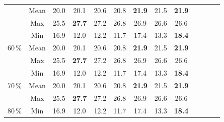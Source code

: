 \documentclass[fleqn,11pt]{ExcelAtFIT} %
\begin{document}
\begin{table}[t!]
\begin{tabular}{| c | c | c| c | c | c | c | c | c | c | c | c | c |}
         &Mean& 20.0 & 20.1  & 20.6
         & 20.8 & {\bf 21.9} & 21.5 & {\bf 21.9} \\ %

         &\textcolor{grayintable}{Max}& \textcolor{grayintable}{25.5} & \textcolor{grayintable}{{\bf 27.7}}  & \textcolor{grayintable}{27.2}
         & \textcolor{grayintable}{26.8} & \textcolor{grayintable}{26.9} & \textcolor{grayintable}{26.6}& \textcolor{grayintable}{26.6} \\ \hline\hline

         \multirow{3}{*}{60\,\%} &\textcolor{grayintable}{Min}& \textcolor{grayintable}{16.9} & \textcolor{grayintable}{12.0}  & \textcolor{grayintable}{12.2}
        & \textcolor{grayintable}{11.7} & \textcolor{grayintable}{17.4} & \textcolor{grayintable}{13.3}& \textcolor{grayintable}{{\bf 18.4}} \\ %

         &Mean& 20.0 & 20.1  & 20.6
         & 20.8 & {\bf 21.9} & 21.5 & {\bf 21.9} \\ %

         &\textcolor{grayintable}{Max}& \textcolor{grayintable}{25.5} & \textcolor{grayintable}{{\bf 27.7}}  & \textcolor{grayintable}{27.2}
         & \textcolor{grayintable}{26.8} & \textcolor{grayintable}{26.9} & \textcolor{grayintable}{26.6}& \textcolor{grayintable}{26.6} \\ \hline\hline

         \multirow{3}{*}{70\,\%} &\textcolor{grayintable}{Min}& \textcolor{grayintable}{16.9} & \textcolor{grayintable}{12.0}  & \textcolor{grayintable}{12.2}
        & \textcolor{grayintable}{11.7} & \textcolor{grayintable}{17.4} & \textcolor{grayintable}{13.3}& \textcolor{grayintable}{{\bf 18.4}} \\ %

         &Mean& 20.0 & 20.1  & 20.6
         & 20.8 & {\bf 21.9} & 21.5 & {\bf 21.9} \\ %

         &\textcolor{grayintable}{Max}& \textcolor{grayintable}{25.5} & \textcolor{grayintable}{{\bf 27.7}}  & \textcolor{grayintable}{27.2}
         & \textcolor{grayintable}{26.8} & \textcolor{grayintable}{26.9} & \textcolor{grayintable}{26.6}& \textcolor{grayintable}{26.6} \\ \hline\hline

         \multirow{3}{*}{80\,\%} &\textcolor{grayintable}{Min}& \textcolor{grayintable}{16.9} & \textcolor{grayintable}{12.0}  & \textcolor{grayintable}{12.2}
        & \textcolor{grayintable}{11.7} & \textcolor{grayintable}{17.4} & \textcolor{grayintable}{13.3}& \textcolor{grayintable}{{\bf 18.4}} \\ %


\end{tabular}
\end{table}
\end{document}
